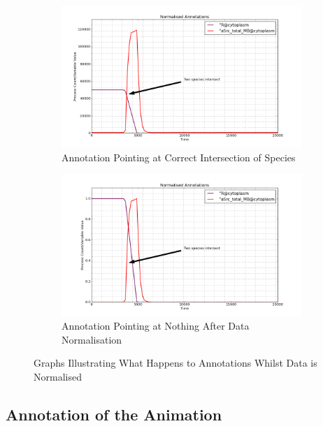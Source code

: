 \begin{figure}[h!]
    \centering
    \begin{subfigure}[b]{0.6\textwidth}
        \centering
        \includegraphics[width=\textwidth]{images/unnormalised_annotation.png}
        \caption{Annotation Pointing at Correct Intersection of Species}
        \label{fig:distance_scale_a}
    \end{subfigure}

    \begin{subfigure}[b]{0.6\textwidth}
        \centering
        \includegraphics[width=\textwidth]{images/normalised_annotation.png}
        \caption{Annotation Pointing at Nothing After Data Normalisation}
        \label{fig:distance_scale_b}
    \end{subfigure}
    \caption{Graphs Illustrating What Happens to Annotations Whilst Data is Normalised}
    \label{fig:distance_scale}
\end{figure}

\subsection{Annotation of the Animation}
\label{sec:anime_annotation}

